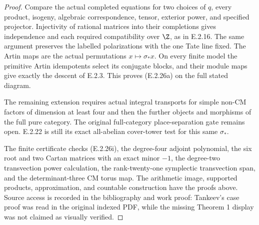\begin{proof}
Compare the actual completed equations
for two choices of \(q\), every product,
isogeny, algebraic correspondence, tensor,
exterior power, and specified projector.
Injectivity of rational matrices into
their completions gives independence
and each required compatibility over
\(\Z\), as in E.2.16. The same argument
preserves the labelled polarizations
with the one Tate line fixed. The
Artin maps are the actual permutations
\(x\mapsto\sigma_*x\). On every finite
model the primitive Artin idempotents
select its conjugate blocks, and their
module maps give exactly the descent
of E.2.3. This proves (E.2.26a) on
the full stated diagram.

The remaining extension requires actual
integral transports for simple non-CM
factors of dimension at least four and
then the further objects and morphisms
of the full pure category. The original
full-category place-separation gate
remains open. E.2.22 is still its exact
all-abelian cover-tower test for this
same \(\sigma_*\).

The finite certificate
checks (E.2.26i), the degree-four
adjoint polynomial, the six root and
two Cartan matrices with an exact
minor \(-1\), the degree-two
transvection power calculation, the
rank-twenty-one symplectic transvection
span, and the determinant-three CM
torus map. The arithmetic image,
supported products, approximation,
and countable construction have the
proofs above. Source access is recorded
in the bibliography and work proof:
Tankeev's case proof was read in the
original indexed PDF, while the missing
Theorem 1 display was not claimed as
visually verified.
\end{proof}
